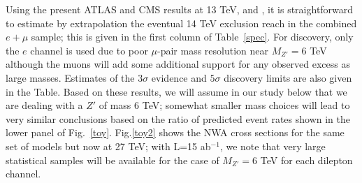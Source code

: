 \documentclass[14pt]{article}
\begin{document}
Using the present ATLAS and CMS results at 13 TeV, \cite{Aaboud:2017buh} and \cite{Sirunyan:2018exx}, it is straightforward to estimate by extrapolation the eventual 14 TeV 
exclusion reach in the combined $e+\mu$ sample; this is given in the first column of Table~\ref{spec}. For discovery, only the $e$ channel is used due to poor $\mu$-pair mass 
resolution near $M_{Z'}=6$ TeV although the muons will add some additional support for any observed excess as large masses. Estimates of the $3\sigma$ evidence and $5\sigma$ 
discovery limits are also given in the Table. Based on these results, we will assume in our study below that we are dealing with a $Z'$ of mass 6 TeV; somewhat smaller mass 
choices will lead to very similar conclusions based on the ratio of predicted event rates shown in the lower panel of Fig.~\ref{toy}.  Fig.\ref{toy2} shows the NWA cross 
sections for the same set of models but now at 27 TeV; with L=15 ab$^{-1}$, we note that very large statistical samples will be available for the case of $M_{Z'}=6$ TeV 
for each dilepton channel. 
\end{document}
